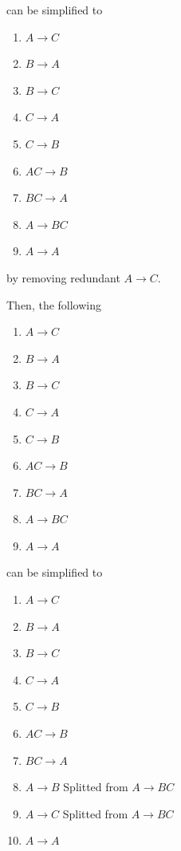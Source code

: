 \documentclass[12pt]{article}
\begin{document}
\begin{enumerate}[1.]
\begin{enumerate}[1.]
            can be simplified to

            \begin{enumerate}[1.]
                \item $A \to C$
                \item $B \to A$
                \item $B \to C$
                \item $C \to A$
                \item $C \to B$
                \item $AC \to B$
                \item $BC \to A$
                \item $A \to BC$
                \item $A \to A$
            \end{enumerate}

            by removing redundant $A \to C$.

            \bigskip

            Then, the following

            \begin{enumerate}[1.]
                \item $A \to C$
                \item $B \to A$
                \item $B \to C$
                \item $C \to A$
                \item $C \to B$
                \item $AC \to B$
                \item $BC \to A$
                \item $A \to BC$
                \item $A \to A$
            \end{enumerate}

            can be simplified to

            \begin{enumerate}[1.]
                \item $A \to C$
                \item $B \to A$
                \item $B \to C$
                \item $C \to A$
                \item $C \to B$
                \item $AC \to B$
                \item $BC \to A$
                \item $A \to B$ \color{red}Splitted from $A \to BC$\color{black}
                \item $A \to C$ \color{red}Splitted from $A \to BC$\color{black}
                \item $A \to A$
            \end{enumerate}


\end{enumerate}
\end{enumerate}
\end{document}
